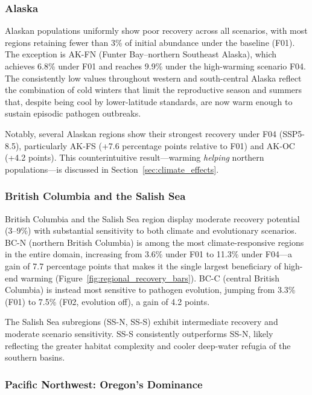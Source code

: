 \subsubsection{Alaska}

Alaskan populations uniformly show poor recovery across all scenarios,
with most regions retaining fewer than 3\% of initial abundance under
the baseline (F01).  The exception is AK-FN (Funter Bay--northern
Southeast Alaska), which achieves 6.8\% under F01 and reaches 9.9\%
under the high-warming scenario F04.  The consistently low values
throughout western and south-central Alaska reflect the combination of
cold winters that limit the reproductive season and summers that,
despite being cool by lower-latitude standards, are now warm enough to
sustain episodic pathogen outbreaks.

Notably, several Alaskan regions show their strongest recovery under
F04 (SSP5-8.5), particularly AK-FS (+7.6 percentage points relative to
F01) and AK-OC (+4.2 points).  This counterintuitive result---warming
\textit{helping} northern populations---is discussed in
Section~\ref{sec:climate_effects}.

\subsubsection{British Columbia and the Salish Sea}

British Columbia and the Salish Sea region display moderate recovery
potential (3--9\%) with substantial sensitivity to both climate and
evolutionary scenarios.  BC-N (northern British Columbia) is among the
most climate-responsive regions in the entire domain, increasing from
3.6\% under F01 to 11.3\% under F04---a gain of 7.7 percentage
points that makes it the single largest beneficiary of high-end warming
(Figure~\ref{fig:regional_recovery_bars}).  BC-C (central British
Columbia) is instead most sensitive to pathogen evolution, jumping from
3.3\% (F01) to 7.5\% (F02, evolution off), a gain of 4.2 points.

The Salish Sea subregions (SS-N, SS-S) exhibit intermediate recovery
and moderate scenario sensitivity.  SS-S consistently outperforms SS-N,
likely reflecting the greater habitat complexity and cooler deep-water
refugia of the southern basins.

\subsubsection{Pacific Northwest: Oregon's Dominance}

